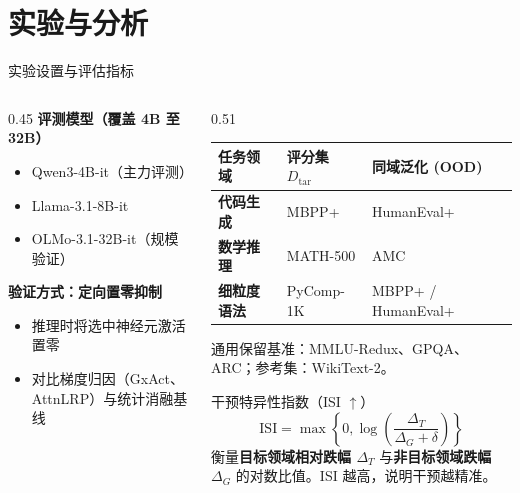 \documentclass{beamer}
\begin{document}
\section{实验与分析}

\begin{frame}{实验设置与评估指标}
    \begin{columns}[T]
        \begin{column}{0.45\textwidth}
            \textbf{评测模型（覆盖 4B 至 32B）}
            \begin{itemize}
                \item Qwen3-4B-it（主力评测）
                \item Llama-3.1-8B-it
                \item OLMo-3.1-32B-it（规模验证）
            \end{itemize}
            \vspace{0.4em}
            \textbf{验证方式：定向置零抑制}
            \begin{itemize}
                \item 推理时将选中神经元激活置零
                \item 对比梯度归因（GxAct、AttnLRP）与统计消融基线
            \end{itemize}
        \end{column}
        \begin{column}{0.51\textwidth}
            \scriptsize
            \setlength{\tabcolsep}{4pt}
            \begin{tabular}{>{\bfseries}l l l}
                \toprule
                任务领域 & 评分集 $D_{\mathrm{tar}}$ & 同域泛化 (OOD) \\
                \midrule
                代码生成 & MBPP+ & HumanEval+ \\
                数学推理 & MATH-500 & AMC \\
                细粒度语法 & PyComp-1K & MBPP+ / HumanEval+ \\
                \bottomrule
            \end{tabular}
            \vspace{0.2em}\par
            {\scriptsize 通用保留基准：MMLU-Redux、GPQA、ARC；参考集：WikiText-2。}
            
            \vspace{0.2em}
            \begin{alertblock}{干预特异性指数（ISI $\uparrow$）}
                \scriptsize
                $$\mathrm{ISI} = \max\left\{0, \log\left(\frac{\Delta_T}{\Delta_G + \delta}\right)\right\}$$
                衡量\textbf{目标领域相对跌幅 $\Delta_T$} 与\textbf{非目标领域跌幅 $\Delta_G$} 的对数比值。ISI 越高，说明干预越精准。
            \end{alertblock}
        \end{column}
    \end{columns}
\end{frame}
\end{document}
